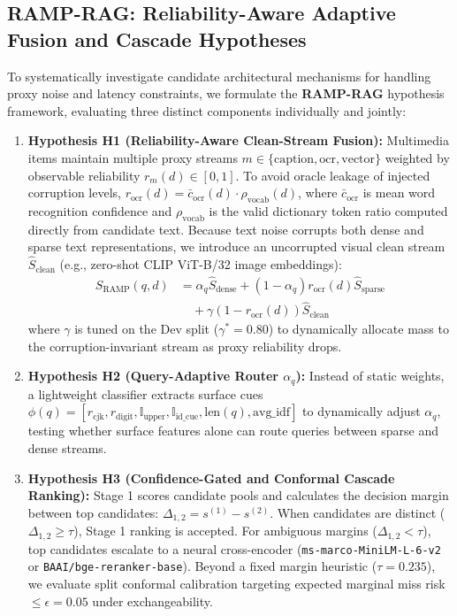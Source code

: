 \documentclass[conference]{IEEEtran}
\begin{document}
\subsection{RAMP-RAG: Reliability-Aware Adaptive Fusion and Cascade Hypotheses}
\label{sec:ramp_rag}
To systematically investigate candidate architectural mechanisms for handling proxy noise and latency constraints, we formulate the \textbf{RAMP-RAG} hypothesis framework, evaluating three distinct components individually and jointly:
\begin{enumerate}
    \setlength{\itemsep}{1pt plus 0.5pt}
    \setlength{\parskip}{0pt}
    \item \textbf{Hypothesis H1 (Reliability-Aware Clean-Stream Fusion):} Multimedia items maintain multiple proxy streams $m \in \{\text{caption}, \text{ocr}, \text{vector}\}$ weighted by observable reliability $r_m(d) \in [0, 1]$. To avoid oracle leakage of injected corruption levels, $r_{\text{ocr}}(d) = \bar{c}_{\text{ocr}}(d) \cdot \rho_{\text{vocab}}(d)$, where $\bar{c}_{\text{ocr}}$ is mean word recognition confidence and $\rho_{\text{vocab}}$ is the valid dictionary token ratio computed directly from candidate text. Because text noise corrupts both dense and sparse text representations, we introduce an uncorrupted visual clean stream $\hat{S}_{\text{clean}}$ (e.g., zero-shot CLIP ViT-B/32 image embeddings):
    \begin{equation}
    \begin{aligned}
        S_{\text{RAMP}}(q, d) &= \alpha_q \hat{S}_{\text{dense}} + (1 - \alpha_q) r_{\text{ocr}}(d) \hat{S}_{\text{sparse}} \\
        &\quad + \gamma (1 - r_{\text{ocr}}(d)) \hat{S}_{\text{clean}}
    \end{aligned}
    \label{eq:ramp}
    \end{equation}
    where $\gamma$ is tuned on the Dev split ($\gamma^* = 0.80$) to dynamically allocate mass to the corruption-invariant stream as proxy reliability drops.
    \item \textbf{Hypothesis H2 (Query-Adaptive Router $\alpha_q$):} Instead of static weights, a lightweight classifier extracts surface cues $\phi(q) = [r_{\text{cjk}}, r_{\text{digit}}, \mathbb{I}_{\text{upper}}, \mathbb{I}_{\text{id\_cue}}, \text{len}(q), \text{avg\_idf}]$ to dynamically adjust $\alpha_q$, testing whether surface features alone can route queries between sparse and dense streams.
    \item \textbf{Hypothesis H3 (Confidence-Gated and Conformal Cascade Ranking):} Stage 1 scores candidate pools and calculates the decision margin between top candidates: $\Delta_{1,2} = s^{(1)} - s^{(2)}$. When candidates are distinct ($\Delta_{1,2} \ge \tau$), Stage 1 ranking is accepted. For ambiguous margins ($\Delta_{1,2} < \tau$), top candidates escalate to a neural cross-encoder (\texttt{ms-marco-MiniLM-L-6-v2} or \texttt{BAAI/bge-reranker-base}). Beyond a fixed margin heuristic ($\tau = 0.235$), we evaluate split conformal calibration targeting expected marginal miss risk $\le \epsilon = 0.05$ under exchangeability.
\end{enumerate}
\end{document}
